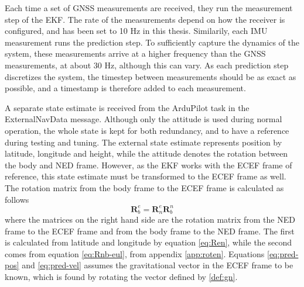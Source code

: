     Each time a set of GNSS measurements are received, they run the measurement step of the EKF. The rate of the measurements depend on how the receiver is configured, and has been set to 10 Hz in this thesis. Similarily, each IMU measurement runs the prediction step. To sufficiently capture the dynamics of the system, these measurements arrive at a higher frequency than the GNSS measurements, at about 30 Hz, although this can vary. As each prediction step discretizes the system, the timestep between measurements should be as exact as possible, and a timestamp is therefore added to each measurement.\\ 
    
    A separate state estimate is received from the ArduPilot task in the ExternalNavData message. Although only the attitude is used during normal operation, the whole state is kept for both redundancy, and to have a reference during testing and tuning. The external state estimate represents position by latitude, longitude and height, while the attitude denotes the rotation between the body and NED frame. However, as the EKF works with the ECEF frame of reference, this state estimate must be transformed to the ECEF frame as well. The rotation matrix from the body frame to the ECEF frame is calculated as follows
    \begin{equation}
        \mathbf{R}^e_b = \mathbf{R}^e_n\mathbf{R}^n_b
    \end{equation}
    where the matrices on the right hand side are the rotation matrix from the NED frame to the ECEF frame and from the body frame to the NED frame. The first is calculated from latitude and longitude by equation \ref{eq:Ren}, while the second comes from equation \ref{eq:Rnb-eul}, from appendix \ref{app:roten}. Equations \ref{eq:pred-pos} and \ref{eq:pred-vel} assumes the gravitational vector in the ECEF frame to be known, which is found by rotating the vector defined by \ref{def:gn}. 
    
    
    